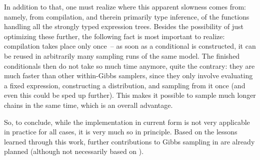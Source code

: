 In addition to that, one must realize where this apparent slowness comes from: namely, from
compilation, and therein primarily type inference, of the functions handling all the strongly typed
expression trees.  Besides the possibility of just optimizing these further, the following fact is
most important to realize: compilation takes place only once~-- as soon as a conditional is
constructed, it can be reused in arbitrarily many sampling runs of the same model.  The finished
conditionals then do not take so much time anymore, quite the contrary: they are much faster than
other within-Gibbs samplers, since they only involve evaluating a fixed expression, constructing a
distribution, and sampling from it once (and even this could be sped up further).  This makes it
possible to sample much longer chains in the same time, which is an overall advantage.

So, to conclude, while the implementation in current form is not very applicable in practice for all
cases, it is very much so in principle.  Based on the lessons learned through this work, further
contributions to Gibbs sampling in \turingjl{} are already planned (although not necessarily based
on \autogibbsjl{}).

